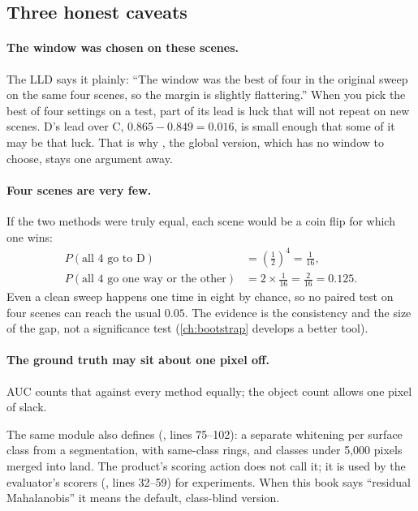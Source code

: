\subsection{Three honest caveats}

\paragraph{The window was chosen on these scenes.} The LLD says it plainly: ``The window was the best of four
in the original sweep on the same four scenes, so the margin is slightly flattering.'' When you pick the best
of four settings on a test, part of its lead is luck that will not repeat on new scenes. D's lead over C,
$0.865-0.849=0.016$, is small enough that some of it may be that luck. That is why ,
the global version, which has no window to choose, stays one argument away.

\paragraph{Four scenes are very few.} If the two methods were truly equal, each scene would be a coin flip for
which one wins:
\begin{align*}
P(\text{all 4 go to D}) &= \left(\tfrac12\right)^4 = \tfrac{1}{16},\\
P(\text{all 4 go one way or the other}) &= 2\times\tfrac{1}{16} = \tfrac{2}{16} = 0.125.
\end{align*}
Even a clean sweep happens one time in eight by chance, so no paired test on four scenes can reach the usual
$0.05$. The evidence is the consistency and the size of the gap, not a significance test (\cref{ch:bootstrap}
develops a better tool).

\paragraph{The ground truth may sit about one pixel off.} AUC counts that against every method equally; the
object count allows one pixel of slack.

\begin{sourcenote}
The same module also defines  (, lines
75--102): a separate whitening per surface class from a segmentation, with same-class rings, and classes under
5,000 pixels merged into land. The product's scoring action does not call it; it is used by the evaluator's
scorers (, lines 32--59) for experiments. When this book says ``residual
Mahalanobis'' it means the default, class-blind version.
\end{sourcenote}

